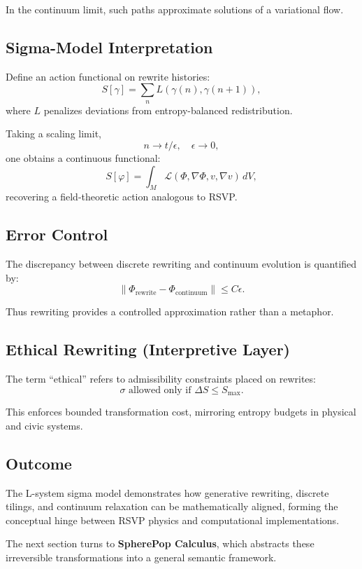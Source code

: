 \documentclass[12pt]{article}
\begin{document}
In the continuum limit, such paths approximate solutions of a variational flow.

\subsection{Sigma-Model Interpretation}

Define an action functional on rewrite histories:
\[
S[\gamma] = \sum_{n} L(\gamma(n),\gamma(n+1)),
\]
where $L$ penalizes deviations from entropy-balanced redistribution.

Taking a scaling limit,
\[
n \to t/\epsilon,\quad \epsilon \to 0,
\]
one obtains a continuous functional:
\[
S[\varphi] = \int_M \mathcal{L}(\Phi,\nabla\Phi,v,\nabla v)\,dV,
\]
recovering a field-theoretic action analogous to RSVP.

\subsection{Error Control}

The discrepancy between discrete rewriting and continuum evolution is quantified by:
\[
\|\Phi_{\text{rewrite}} - \Phi_{\text{continuum}}\| \le C\epsilon.
\]

Thus rewriting provides a controlled approximation rather than a metaphor.

\subsection{Ethical Rewriting (Interpretive Layer)}

The term ``ethical'' refers to admissibility constraints placed on rewrites:
\[
\sigma \text{ allowed only if } \Delta S \le S_{\max}.
\]

This enforces bounded transformation cost, mirroring entropy budgets in physical and civic systems.

\subsection{Outcome}

The L-system sigma model demonstrates how generative rewriting, discrete tilings, and continuum relaxation can be mathematically aligned, forming the conceptual hinge between RSVP physics and computational implementations.

\bigskip

The next section turns to \textbf{SpherePop Calculus}, which abstracts these irreversible transformations into a general semantic framework.
\end{document}
